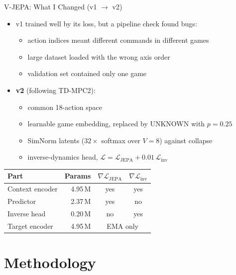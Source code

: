 \documentclass[aspectratio=43,10pt]{beamer}
\begin{document}
\begin{frame}{V-JEPA: What I Changed (v1 $\rightarrow$ v2)}
  \begin{itemize}\setlength\itemsep{0.4em}
    \item v1 trained well by its loss, but a pipeline check found bugs:
      \begin{itemize}\small
        \item action indices meant different commands in different games
        \item large dataset loaded with the wrong axis order
        \item validation set contained only one game
      \end{itemize}
    \item \textbf{v2} (following TD-MPC2):
      \begin{itemize}\small
        \item common 18-action space
        \item learnable game embedding, replaced by UNKNOWN with $p=0.25$
        \item SimNorm latents ($32\times$ softmax over $V=8$) against collapse
        \item inverse-dynamics head, $\mathcal{L}=\mathcal{L}_{\text{JEPA}}+0.01\,\mathcal{L}_{\text{inv}}$
      \end{itemize}
  \end{itemize}
  \vspace{0.2em}
  {\footnotesize
  \begin{tabular}{@{}lrcc@{}}
    \toprule
    Part & Params & $\nabla\mathcal{L}_{\text{JEPA}}$ & $\nabla\mathcal{L}_{\text{inv}}$ \\
    \midrule
    Context encoder & 4.95\,M & yes & yes \\
    Predictor & 2.37\,M & yes & no \\
    Inverse head & 0.20\,M & no & yes \\
    Target encoder & 4.95\,M & \multicolumn{2}{c}{EMA only} \\
    \bottomrule
  \end{tabular}}
\end{frame}

\section{Methodology}
\end{document}
